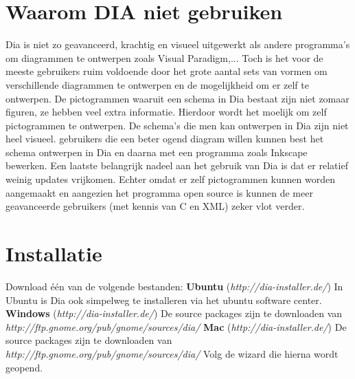 \documentclass[12pt,a4paper]{report}
\begin{document}
\begin{flushleft}
\chapter*{Waarom DIA niet gebruiken}
Dia is niet zo geavanceerd, krachtig en visueel uitgewerkt als andere programma's om diagrammen te ontwerpen zoals Visual Paradigm,... Toch is het voor de meeste gebruikers ruim voldoende door het grote aantal sets van vormen om verschillende diagrammen te ontwerpen en de mogelijkheid om er zelf te ontwerpen. De pictogrammen waaruit een schema in Dia bestaat zijn niet zomaar figuren, ze hebben veel extra informatie. Hierdoor wordt het moelijk om zelf pictogrammen te ontwerpen. De schema's die men kan ontwerpen in Dia zijn niet heel visueel. gebruikers die een beter ogend diagram willen kunnen best het schema ontwerpen in Dia en daarna met een programma zoals Inkscape bewerken. Een laatste belangrijk nadeel aan het gebruik van Dia is dat er relatief weinig updates vrijkomen. Echter omdat er zelf pictogrammen kunnen worden aangemaakt en aangezien het programma open source is kunnen de meer geavanceerde gebruikers (met kennis van C en XML) zeker vlot verder.


\chapter*{Installatie}
Download één van de volgende bestanden:
\linebreak\linebreak
\textbf{Ubuntu} (\textit{http://dia-installer.de/})\linebreak
In Ubuntu is Dia ook simpelweg te installeren via het ubuntu software center.
\linebreak\linebreak
\textbf{Windows} (\textit{http://dia-installer.de/})\linebreak
De source packages zijn te downloaden van \textit{http://ftp.gnome.org/pub/gnome/sources/dia/}
\linebreak\linebreak
\textbf{Mac} (\textit{http://dia-installer.de/})\linebreak
De source packages zijn te downloaden van \textit{http://ftp.gnome.org/pub/gnome/sources/dia/}
\linebreak\linebreak
Volg de wizard die hierna wordt geopend.



\end{flushleft}
\end{document}
